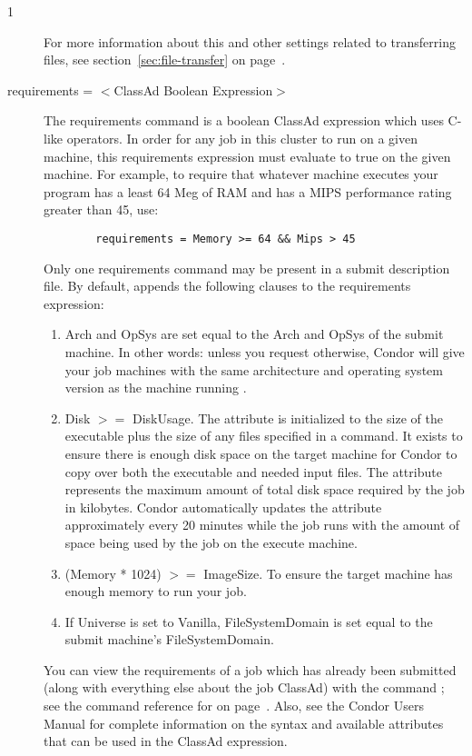 \begin{ManPage}{\label{man-condor-submit}}{1}
\begin{description}
For more information about this and other settings related to
transferring files, see section~\ref{sec:file-transfer} on
page~\pageref{sec:file-transfer}.



\item[requirements = $<$ClassAd Boolean Expression$>$]
The requirements
command is a boolean ClassAd expression which uses C-like operators. In
order for any job in this cluster to run on a given machine, this
requirements expression must evaluate to true on the given machine. For
example, to require that whatever machine executes your program has a
least 64 Meg of RAM and has a MIPS performance rating greater than 45,
use: 
\begin{verbatim}
        requirements = Memory >= 64 && Mips > 45
\end{verbatim}
Only one requirements command may be present in a
submit description file.
By default,  appends the following clauses to
the requirements expression:
\begin{enumerate}
	\item Arch and OpSys are set equal to the Arch and OpSys of the
submit machine.  In other words: unless you request otherwise, Condor will give your
job machines with the same architecture and operating system version as
the machine running .
	\item Disk $>=$ DiskUsage. 
The  attribute is initialized to the size of the
executable plus the size of any files specified in a
 command.
It exists to ensure there is enough disk space on the 
target machine for Condor to copy over both the executable
and needed input files.
The  attribute represents the maximum amount of
total disk space required by the job in kilobytes.
Condor automatically updates the  attribute
approximately every 20 minutes while the job runs with the
amount of space being used by the job on the execute machine.  
	\item (Memory * 1024) $>=$ ImageSize.  To ensure the target machine
has enough memory to run your job.
	\item If Universe is set to Vanilla, FileSystemDomain is set equal to
the submit machine's FileSystemDomain.
\end{enumerate}
You can view the requirements of a job
which has already been submitted (along with everything else about the
job ClassAd) with the command ; see the command reference for
 on page~\pageref{man-condor-q}.  Also, see the Condor Users
Manual for complete information on the syntax and available attributes
that can be used in the ClassAd expression.



\end{description}
\end{ManPage}
